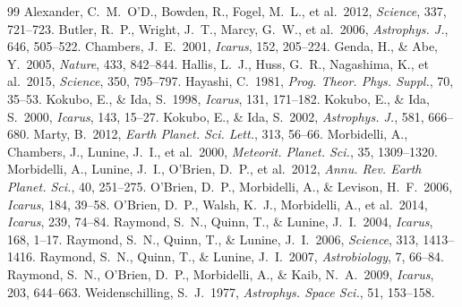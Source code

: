 \documentclass[11pt,a4paper]{article}
\begin{document}
\begin{thebibliography}{99}
 Alexander, C.~M.~O'D., Bowden, R., Fogel, M.~L., et al.\ 2012, \textit{Science}, 337, 721--723.
 Butler, R.~P., Wright, J.~T., Marcy, G.~W., et al.\ 2006, \textit{Astrophys. J.}, 646, 505--522.
 Chambers, J.~E.\ 2001, \textit{Icarus}, 152, 205--224.
 Genda, H., \& Abe, Y.\ 2005, \textit{Nature}, 433, 842--844.
 Hallis, L.~J., Huss, G.~R., Nagashima, K., et al.\ 2015, \textit{Science}, 350, 795--797.
 Hayashi, C.\ 1981, \textit{Prog. Theor. Phys. Suppl.}, 70, 35--53.
 Kokubo, E., \& Ida, S.\ 1998, \textit{Icarus}, 131, 171--182.
 Kokubo, E., \& Ida, S.\ 2000, \textit{Icarus}, 143, 15--27.
 Kokubo, E., \& Ida, S.\ 2002, \textit{Astrophys. J.}, 581, 666--680.
 Marty, B.\ 2012, \textit{Earth Planet. Sci. Lett.}, 313, 56--66.
 Morbidelli, A., Chambers, J., Lunine, J.~I., et al.\ 2000, \textit{Meteorit. Planet. Sci.}, 35, 1309--1320.
 Morbidelli, A., Lunine, J.~I., O'Brien, D.~P., et al.\ 2012, \textit{Annu. Rev. Earth Planet. Sci.}, 40, 251--275.
 O'Brien, D.~P., Morbidelli, A., \& Levison, H.~F.\ 2006, \textit{Icarus}, 184, 39--58.
 O'Brien, D.~P., Walsh, K.~J., Morbidelli, A., et al.\ 2014, \textit{Icarus}, 239, 74--84.
 Raymond, S.~N., Quinn, T., \& Lunine, J.~I.\ 2004, \textit{Icarus}, 168, 1--17.
 Raymond, S.~N., Quinn, T., \& Lunine, J.~I.\ 2006, \textit{Science}, 313, 1413--1416.
 Raymond, S.~N., Quinn, T., \& Lunine, J.~I.\ 2007, \textit{Astrobiology}, 7, 66--84.
 Raymond, S.~N., O'Brien, D.~P., Morbidelli, A., \& Kaib, N.~A.\ 2009, \textit{Icarus}, 203, 644--663.
 Weidenschilling, S.~J.\ 1977, \textit{Astrophys. Space Sci.}, 51, 153--158.
\end{thebibliography}
\end{document}
